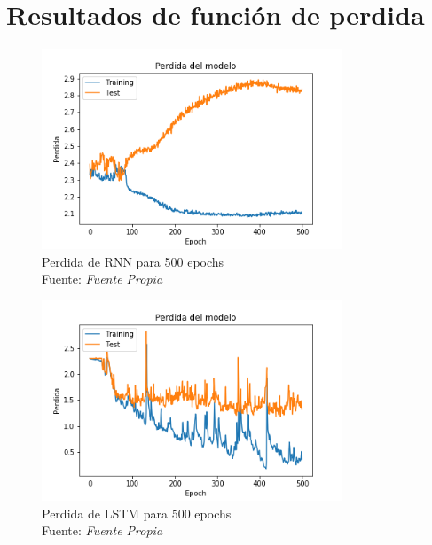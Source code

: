 \section{Resultados de función de perdida}

\begin{figure}[H]
	\centering
	\includegraphics[width=0.8\textwidth]{Figures/RNNsimplecost}
	\caption{Perdida de RNN para 500 epochs\\ Fuente: {\textit{Fuente Propia}}}
	\label{RNNSIMPLEcost}
\end{figure} 


\begin{figure}[H]
	\centering
	\includegraphics[width=0.8\textwidth]{Figures/LSTMsimplecost}
	\caption{Perdida de LSTM para 500 epochs\\ Fuente: {\textit{Fuente Propia}}}
	\label{LSTMsimplecost}
\end{figure} 

